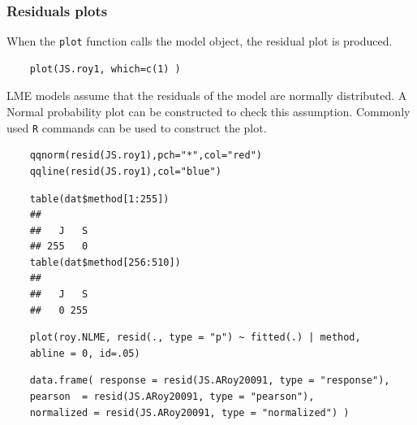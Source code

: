 \documentclass[Main.tex]{subfiles}
\begin{document}
\subsubsection{Residuals plots}



When the \texttt{plot} function calls the model object, the residual plot is produced.




\begin{framed}
	\begin{verbatim}
	plot(JS.roy1, which=c(1) )
	\end{verbatim}
\end{framed}

LME models assume that the residuals of the model are normally distributed. A Normal probability plot can be constructed to check this assumption. Commonly used \texttt{R} commands can be used to construct the plot.


\begin{framed}
	\begin{verbatim}
	qqnorm(resid(JS.roy1),pch="*",col="red")
	qqline(resid(JS.roy1),col="blue")
	\end{verbatim}
\end{framed}

\begin{framed}
	\begin{verbatim}
	table(dat$method[1:255])
	## 
	##   J   S 
	## 255   0
	table(dat$method[256:510])
	## 
	##   J   S 
	##   0 255
	\end{verbatim}	
\end{framed}

\begin{framed}
	\begin{verbatim}
	plot(roy.NLME, resid(., type = "p") ~ fitted(.) | method, 
	abline = 0, id=.05)
	\end{verbatim}
\end{framed}





\begin{framed}
	\begin{verbatim}
	data.frame( response = resid(JS.ARoy20091, type = "response"), 
	pearson  = resid(JS.ARoy20091, type = "pearson"), 
	normalized = resid(JS.ARoy20091, type = "normalized") )
	\end{verbatim}
\end{framed}
\end{document}
